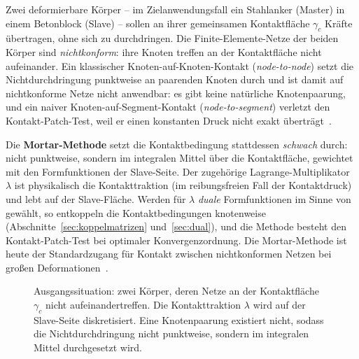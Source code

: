 \documentclass[a4paper,11pt]{article}
\def\bm#1{#1}%
\begin{document}
Zwei deformierbare Körper -- im Zielanwendungsfall ein Stahlanker (Master) in einem Betonblock
(Slave) -- sollen an ihrer gemeinsamen Kontaktfläche $\gamma_c$ Kräfte übertragen, ohne sich zu
durchdringen. Die Finite-Elemente-Netze der beiden Körper sind \emph{nichtkonform}: ihre Knoten
treffen an der Kontaktfläche nicht aufeinander. Ein klassischer Knoten-auf-Knoten-Kontakt
(\emph{node-to-node}) setzt die Nichtdurchdringung punktweise an paarenden Knoten durch und ist
damit auf nichtkonforme Netze nicht anwendbar: es gibt keine natürliche Knotenpaarung, und ein
naiver Knoten-auf-Segment-Kontakt (\emph{node-to-segment}) verletzt den Kontakt-Patch-Test, weil er
einen konstanten Druck nicht exakt überträgt~\citep{wriggers}.

Die \textbf{Mortar-Methode} setzt die Kontaktbedingung stattdessen \emph{schwach} durch: nicht
punktweise, sondern im integralen Mittel über die Kontaktfläche, gewichtet mit den Formfunktionen
der Slave-Seite. Der zugehörige Lagrange-Multiplikator $\bm\lambda$ ist physikalisch die
Kontakttraktion (im reibungsfreien Fall der Kontaktdruck) und lebt auf der Slave-Fläche. Werden für
$\bm\lambda$ \emph{duale} Formfunktionen im Sinne von \citet{wohlmuth2000} gewählt, so
entkoppeln die Kontaktbedingungen knotenweise (Abschnitte~\ref{sec:koppelmatrizen}
und~\ref{sec:dual}), und die Methode besteht den Kontakt-Patch-Test bei optimaler
Konvergenzordnung. Die Mortar-Methode ist heute der Standardzugang für Kontakt zwischen
nichtkonformen Netzen bei großen Deformationen~\citep{puso2004,popp2010,farah}.

\begin{figure}[htbp]
\centering
{}
\caption[Kontaktproblem mit nichtkonformen Netzen]{Ausgangssituation: zwei Körper, deren Netze an
der Kontaktfläche $\gamma_c$ nicht aufeinandertreffen. Die Kontakttraktion $\bm\lambda$ wird auf der
Slave-Seite diskretisiert. Eine Knotenpaarung existiert nicht, sodass die Nichtdurchdringung nicht
punktweise, sondern im integralen Mittel durchgesetzt wird.}
\label{fig:kontaktproblem}
\end{figure}
\end{document}

